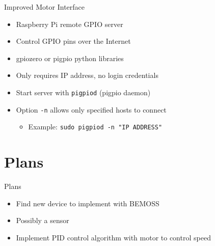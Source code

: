 \documentclass{beamer}
\begin{document}
\begin{frame}{Improved Motor Interface}{}
	\begin{itemize}
		\item Raspberry Pi remote GPIO server
		\item Control GPIO pins over the Internet
		\item gpiozero or pigpio python libraries
		\item Only requires IP address, no login credentials
		\item Start server with \texttt{pigpiod} (pigpio daemon)
		\item Option \texttt{-n} allows only specified hosts to connect
		\begin{itemize}
			\item Example: \texttt{sudo pigpiod -n "IP ADDRESS"}
		\end{itemize}
	\end{itemize}
\end{frame}

\section{Plans}

\begin{frame}{Plans}{}
	\begin{itemize}
		\item Find new device to implement with BEMOSS
		\item Possibly a sensor
		\item Implement PID control algorithm with motor to control speed
	\end{itemize}
\end{frame}

\end{document}
